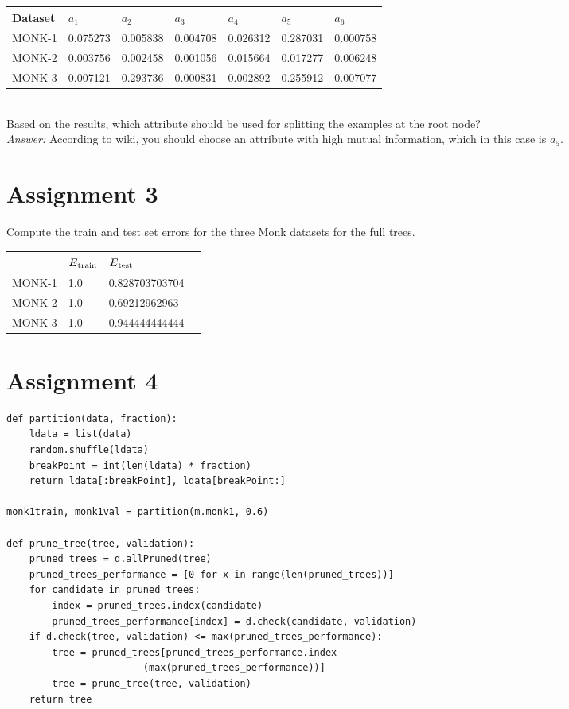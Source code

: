 \documentclass[a4paper]{article}
\begin{document}
\begin{tabularx}{\textwidth}{ |X|X|X|X|X|X|X| }
  \hline
  Dataset & $a_1$ & $a_2$ & $a_3$ & $a_4$ & $a_5$ & $a_6$ \\
  \hline 
  MONK-1  & 0.075273  & 0.005838  & 0.004708 & 0.026312  & 0.287031  & 0.000758  \\
  \hline
  MONK-2  & 0.003756 & 0.002458 & 0.001056 & 0.015664 & 0.017277 & 0.006248 \\
  \hline
  MONK-3  & 0.007121 & 0.293736 & 0.000831 & 0.002892 & 0.255912 & 0.007077  \\
  \hline
\end{tabularx}\\

Based on the results, which attribute should be used for splitting the examples
at the root node?\\
\textit{Answer: } According to wiki, you should choose an attribute with high mutual information, which in this case is $a_5$.

\newpage
\section{Assignment 3}

Compute the train and test set errors for the three Monk datasets for the full trees.

\begin{center}
    \begin{tabular}{ | l | l | l | p{5cm} |}
    \hline
     & $E\textsubscript{train}$ & $E\textsubscript{test}$ \\ \hline
    MONK-1 & 1.0 & 0.828703703704 \\
    MONK-2 & 1.0 & 0.69212962963 \\
    MONK-3 & 1.0 & 0.944444444444 \\
    \hline
    \end{tabular}
\end{center}

\section{Assignment 4}

\begin{lstlisting}
def partition(data, fraction):
    ldata = list(data)
    random.shuffle(ldata)
    breakPoint = int(len(ldata) * fraction)
    return ldata[:breakPoint], ldata[breakPoint:]

monk1train, monk1val = partition(m.monk1, 0.6)

def prune_tree(tree, validation):
    pruned_trees = d.allPruned(tree)
    pruned_trees_performance = [0 for x in range(len(pruned_trees))]
    for candidate in pruned_trees:
        index = pruned_trees.index(candidate)
        pruned_trees_performance[index] = d.check(candidate, validation)
    if d.check(tree, validation) <= max(pruned_trees_performance):
        tree = pruned_trees[pruned_trees_performance.index
        				(max(pruned_trees_performance))]
        tree = prune_tree(tree, validation)
    return tree
\end{lstlisting}
\end{document}
